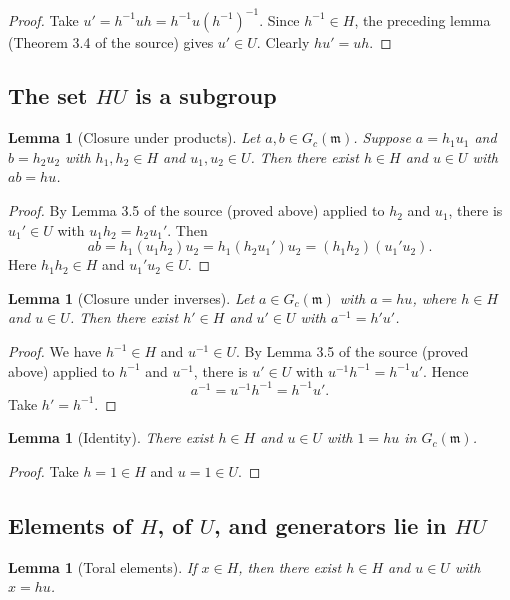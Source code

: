 \documentclass[11pt]{article}
\newtheorem{lemma}[theorem]{Lemma}
\theoremstyle{definition}
\theoremstyle{remark}
\newcommand{\Gm}{G_c(\mathfrak{m})}
\begin{document}
\begin{proof}
Take $u'=h^{-1}uh=h^{-1}u(h^{-1})^{-1}$. Since $h^{-1}\in H$, the preceding lemma (Theorem 3.4 of the source) gives $u'\in U$. Clearly $hu'=uh$.
\end{proof}

\subsection{The set $HU$ is a subgroup}

\begin{lemma}[Closure under products]\label{lem:hu_mul}
Let $a,b\in\Gm$. Suppose $a=h_1u_1$ and $b=h_2u_2$ with $h_1,h_2\in H$ and $u_1,u_2\in U$. Then there exist $h\in H$ and $u\in U$ with $ab=hu$.
\end{lemma}

\begin{proof}
By Lemma 3.5 of the source (proved above) applied to $h_2$ and $u_1$, there is $u_1'\in U$ with $u_1h_2=h_2u_1'$. Then
\[
ab=h_1(u_1h_2)u_2=h_1(h_2u_1')u_2=(h_1h_2)(u_1'u_2).
\]
Here $h_1h_2\in H$ and $u_1'u_2\in U$.
\end{proof}

\begin{lemma}[Closure under inverses]\label{lem:hu_inv}
Let $a\in\Gm$ with $a=hu$, where $h\in H$ and $u\in U$. Then there exist $h'\in H$ and $u'\in U$ with $a^{-1}=h'u'$.
\end{lemma}

\begin{proof}
We have $h^{-1}\in H$ and $u^{-1}\in U$. By Lemma 3.5 of the source (proved above) applied to $h^{-1}$ and $u^{-1}$, there is $u'\in U$ with $u^{-1}h^{-1}=h^{-1}u'$. Hence
\[
a^{-1}=u^{-1}h^{-1}=h^{-1}u'.
\]
Take $h'=h^{-1}$.
\end{proof}

\begin{lemma}[Identity]\label{lem:hu_one}
There exist $h\in H$ and $u\in U$ with $1=hu$ in $\Gm$.
\end{lemma}

\begin{proof}
Take $h=1\in H$ and $u=1\in U$.
\end{proof}

\subsection{Elements of $H$, of $U$, and generators lie in $HU$}

\begin{lemma}[Toral elements]\label{lem:hu_of_torus}
If $x\in H$, then there exist $h\in H$ and $u\in U$ with $x=hu$.
\end{lemma}
\end{document}
